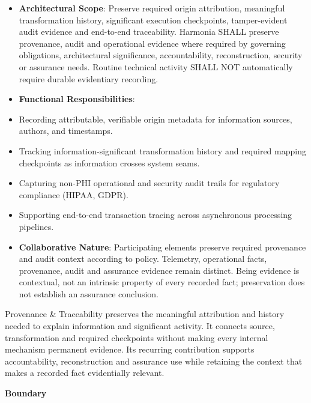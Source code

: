 \begin{itemize}


\item \textbf{Architectural Scope}: Preserve required origin attribution, meaningful transformation history, significant execution checkpoints, tamper-evident audit evidence and end-to-end traceability. Harmonia SHALL preserve provenance, audit and operational evidence where required by governing obligations, architectural significance, accountability, reconstruction, security or assurance needs. Routine technical activity SHALL NOT automatically require durable evidentiary recording.

\item \textbf{Functional Responsibilities}:

\item Recording attributable, verifiable origin metadata for information sources, authors, and timestamps.

\item Tracking information-significant transformation history and required mapping checkpoints as information crosses system seams.

\item Capturing non-PHI operational and security audit trails for regulatory compliance (HIPAA, GDPR).

\item Supporting end-to-end transaction tracing across asynchronous processing pipelines.

\item \textbf{Collaborative Nature}: Participating elements preserve required provenance and audit context according to policy. Telemetry, operational facts, provenance, audit and assurance evidence remain distinct. Being evidence is contextual, not an intrinsic property of every recorded fact; preservation does not establish an assurance conclusion.

\end{itemize}


Provenance \& Traceability preserves the meaningful attribution and history needed to explain information and significant activity. It connects source, transformation and required checkpoints without making every internal mechanism permanent evidence. Its recurring contribution supports accountability, reconstruction and assurance use while retaining the context that makes a recorded fact evidentially relevant.



\textbf{Boundary}



